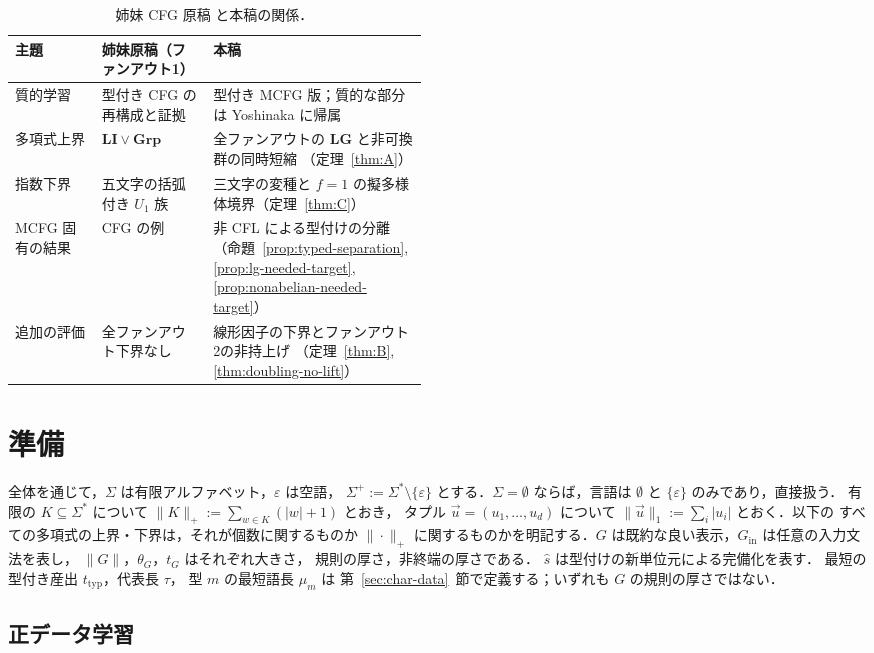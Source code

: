 \documentclass[11pt,a4paper]{ltjsarticle}
\numberwithin{equation}{section}
\theoremstyle{plain}
\theoremstyle{definition}
\theoremstyle{remark}
\newcommand{\tuple}[1]{\vec{#1}}
\newcommand{\eps}{\varepsilon}
\theoremstyle{plain}
\begin{document}
\begin{table}[htbp]
\caption{姉妹 CFG 原稿 \cite{kuriyamaCFG} と本稿の関係．}
\label{tab:companion-overlap}
\centering\footnotesize
\setlength{\tabcolsep}{3pt}
\begin{tabularx}{\linewidth}{@{}p{0.21\linewidth}p{0.27\linewidth}X@{}}
\hline
主題 & 姉妹原稿（ファンアウト1） & 本稿\\
\hline
質的学習 & 型付き CFG の再構成と証拠
 & 型付き MCFG 版；質的な部分は Yoshinaka に帰属\\
多項式上界 & $\mathbf{LI}\vee\mathbf{Grp}$
 & 全ファンアウトの $\mathbf{LG}$ と非可換群の同時短縮
 （定理~\ref{thm:A}）\\
指数下界 & 五文字の括弧付き $U_1$ 族
 & 三文字の変種と $f=1$ の擬多様体境界（定理~\ref{thm:C}）\\
MCFG 固有の結果 & CFG の例
 & 非 CFL による型付けの分離（命題~\ref{prop:typed-separation},
 \ref{prop:lg-needed-target}, \ref{prop:nonabelian-needed-target}）\\
追加の評価 & 全ファンアウト下界なし
 & 線形因子の下界とファンアウト2の非持上げ
 （定理~\ref{thm:B}, \ref{thm:doubling-no-lift}）\\
\hline
\end{tabularx}
\end{table}

\section{準備}
\label{sec:prelim}

全体を通じて，$\Sigma$ は有限アルファベット，$\eps$ は空語，
$\Sigma^+:=\Sigma^*\setminus\{\eps\}$ とする．$\Sigma=\emptyset$ ならば，言語は
$\emptyset$ と $\{\eps\}$ のみであり，直接扱う．
有限の $K\subseteq\Sigma^*$ について $\|K\|_+:=\sum_{w\in K}(|w|+1)$ とおき，
タプル $\tuple u=(u_1,\ldots,u_d)$ について $\|\tuple u\|_1:=\sum_i|u_i|$ とおく．以下の
すべての多項式の上界・下界は，それが個数に関するものか
$\|\cdot\|_+$ に関するものかを明記する．$G$ は既約な良い表示，$G_{\mathrm{in}}$ は任意の入力文法を表し，
$\|G\|$，$\theta_G$，$t_G$ はそれぞれ大きさ，
規則の厚さ，非終端の厚さである．
$\widehat s$ は型付けの新単位元による完備化を表す．
最短の型付き産出 $t_{\mathrm{typ}}$，代表長 $\tau$，
型 $m$ の最短語長 $\mu_m$ は
第~\ref{sec:char-data}~節で定義する；いずれも
$G$ の規則の厚さではない．

\subsection{正データ学習}
\end{document}
